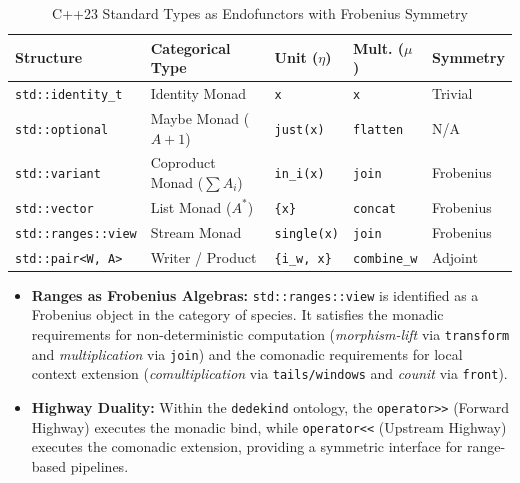 \documentclass[11pt, a4paper]{report}
\begin{document}
\begin{table}[htbp]
\centering
\begin{tabular}{lllll}
\hline
\textbf{Structure} & \textbf{Categorical Type} & \textbf{Unit ($\eta$)} & \textbf{Mult. ($\mu$)} & \textbf{Symmetry} \\ \hline
\texttt{std::identity\_t} & Identity Monad & \texttt{x} & \texttt{x} & Trivial \\
\texttt{std::optional} & Maybe Monad ($A + 1$) & \texttt{just(x)} & \texttt{flatten} & N/A \\
\texttt{std::variant} & Coproduct Monad ($\sum A_i$) & \texttt{in\_i(x)} & \texttt{join} & Frobenius \\
\texttt{std::vector} & List Monad ($A^*$) & \texttt{\{x\}} & \texttt{concat} & Frobenius \\
\texttt{std::ranges::view} & Stream Monad & \texttt{single(x)} & \texttt{join} & Frobenius \\
\texttt{std::pair<W, A>} & Writer / Product & \texttt{\{i\_w, x\}} & \texttt{combine\_w} & Adjoint \\
\hline
\end{tabular}
\caption{C++23 Standard Types as Endofunctors with Frobenius Symmetry}
\label{tab:cpp_frobenius_mapping}
\end{table}

\begin{itemize}
    \item \textbf{Ranges as Frobenius Algebras:} \texttt{std::ranges::view} is identified as a Frobenius object in the category of species. It satisfies the monadic requirements for non-deterministic computation (\textit{morphism-lift} via \texttt{transform} and \textit{multiplication} via \texttt{join}) and the comonadic requirements for local context extension (\textit{comultiplication} via \texttt{tails/windows} and \textit{counit} via \texttt{front}). 
    \item \textbf{Highway Duality:} Within the \texttt{dedekind} ontology, the \texttt{operator>>} (Forward Highway) executes the monadic bind, while \texttt{operator<<} (Upstream Highway) executes the comonadic extension, providing a symmetric interface for range-based pipelines.
\end{itemize}
\end{document}
